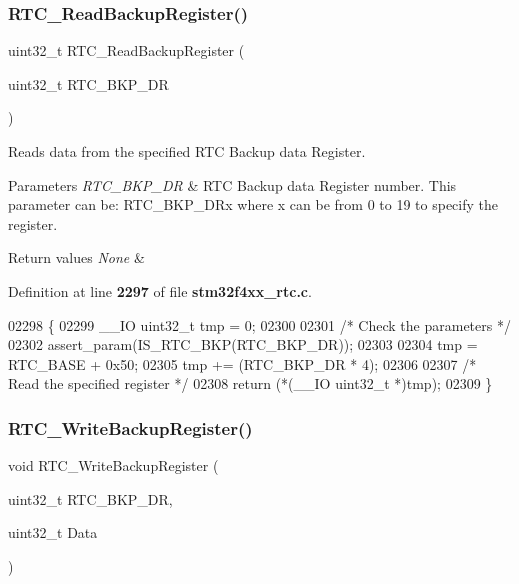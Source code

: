 \subsubsection{R\+T\+C\+\_\+\+Read\+Backup\+Register()}
{\footnotesize\ttfamily uint32\+\_\+t R\+T\+C\+\_\+\+Read\+Backup\+Register (\begin{DoxyParamCaption}\item[{uint32\+\_\+t}]{R\+T\+C\+\_\+\+B\+K\+P\+\_\+\+DR }\end{DoxyParamCaption})}



Reads data from the specified R\+TC Backup data Register. 


\begin{DoxyParams}{Parameters}
{\em R\+T\+C\+\_\+\+B\+K\+P\+\_\+\+DR} & R\+TC Backup data Register number. This parameter can be\+: R\+T\+C\+\_\+\+B\+K\+P\+\_\+\+D\+Rx where x can be from 0 to 19 to specify the register. \\
\hline
\end{DoxyParams}

\begin{DoxyRetVals}{Return values}
{\em None} & \\
\hline
\end{DoxyRetVals}


Definition at line \textbf{ 2297} of file \textbf{ stm32f4xx\+\_\+rtc.\+c}.


\begin{DoxyCode}
02298 \{
02299   \_\_IO uint32\_t tmp = 0;
02300   
02301   \textcolor{comment}{/* Check the parameters */}
02302   assert_param(IS_RTC_BKP(RTC\_BKP\_DR));
02303 
02304   tmp = RTC_BASE + 0x50;
02305   tmp += (RTC\_BKP\_DR * 4);
02306   
02307   \textcolor{comment}{/* Read the specified register */}
02308   \textcolor{keywordflow}{return} (*(\_\_IO uint32\_t *)tmp);
02309 \}
\end{DoxyCode}
\mbox{\label{group__RTC__Group10_gaa1241e2b47d04acc116b50d7b031c3aa}} 
\subsubsection{R\+T\+C\+\_\+\+Write\+Backup\+Register()}
{\footnotesize\ttfamily void R\+T\+C\+\_\+\+Write\+Backup\+Register (\begin{DoxyParamCaption}\item[{uint32\+\_\+t}]{R\+T\+C\+\_\+\+B\+K\+P\+\_\+\+DR,  }\item[{uint32\+\_\+t}]{Data }\end{DoxyParamCaption})}




